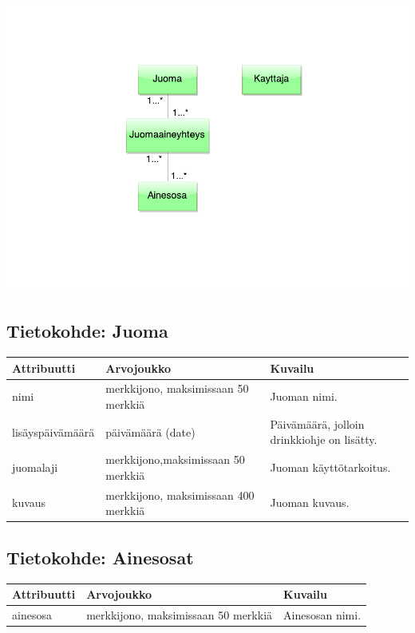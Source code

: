 \documentclass[a4paper]{article}
\begin{document}
\includegraphics[scale=0.8]{kasitekaavio.pdf}

\subsection{Tietokohde: Juoma}
\begin{flushleft}
	\begin{tabular}{|l|l|l|}\hline
			Attribuutti      & Arvojoukko        & Kuvailu\\
			\hline
			nimi & merkkijono, maksimissaan 50 merkkiä & Juoman nimi.\\ 
			\hline		
			lisäyspäivämäärä & päivämäärä (date) & Päivämäärä, jolloin drinkkiohje on lisätty.\\ 
			\hline			
			juomalaji    & merkkijono,maksimissaan 50 merkkiä  & Juoman käyttötarkoitus. \\ 
			\hline
			kuvaus    & merkkijono, maksimissaan 400 merkkiä & Juoman kuvaus. \\ 
				\hline
	\end{tabular}
\end{flushleft}

\subsection{Tietokohde: Ainesosat}
\begin{flushleft}
	\begin{tabular}{|l|l|l|}
			\hline
			Attribuutti & Arvojoukko & Kuvailu \\ 
			\hline
			ainesosa & merkkijono, maksimissaan 50 merkkiä & Ainesosan nimi. \\ 
			\hline
	\end{tabular}
\end{flushleft}
\end{document}
